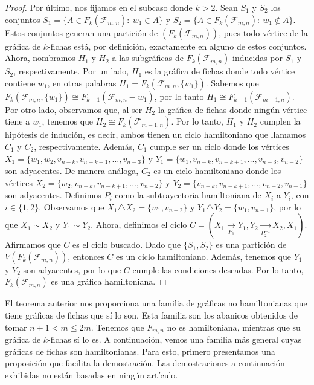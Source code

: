 \begin{proof}
    Por \'ultimo, nos fijamos en el subcaso donde $k>2$. Sean $S_1$ y $S_2$ los
    conjuntos $S_1=\{A \in F_k(\mathcal{F}_{m,n}) \colon\ w_1 \in A\}$ y
    $S_2=\{A \in F_k(\mathcal{F}_{m,n}) \colon\ w_1 \notin A\}$. Estos conjuntos
    generan una partici\'on de $(F_k(\mathcal{F}_{m,n}))$, pues todo v\'ertice
    de la gr\'afica de $k$-fichas est\'a, por definici\'on, exactamente en
    alguno de estos conjuntos. Ahora, nombramos $H_1$ y $H_2$ a las
    subgr\'aficas de $F_k(\mathcal{F}_{m,n})$ inducidas por $S_1$ y $S_2$,
    respectivamente. Por un lado, $H_1$ es la gr\'afica de fichas donde todo
    v\'ertice contiene $w_1$, en otras palabras $H_1=
    F_k(\mathcal{F}_{m,n},\{w_1\})$. Sabemos que $F_k(\mathcal{F}_{m,n},\{w_1\})
    \cong F_{k-1}(\mathcal{F}_{m,n}- w_1)$, por lo tanto $H_1 \cong
    F_{k-1}(\mathcal{F}_{m-1,n})$. Por otro lado, observamos que, al ser $H_2$
    la gr\'afica de fichas donde ning\'un v\'ertice tiene a $w_1$, tenemos que
    $H_2 \cong F_k(\mathcal{F}_{m-1,n})$. Por lo tanto, $H_1$ y $H_2$ cumplen la
    hip\'otesis de induci\'on, es decir, ambos tienen un ciclo hamiltoniano que
    llamamos $C_1$ y $C_2$, respectivamente. Adem\'as, $C_1$ cumple ser un ciclo
    donde los v\'ertices $X_1 = \{w_1, w_2,v_{n-k},v_{n-k+1}, \dots, v_{n-3}\}$
    y $Y_1 = \{w_1,v_{n-k},v_{n-k+1}, \dots, v_{n-3},v_{n-2}\}$ son adyacentes.
    De manera an\'aloga, $C_2$ es un ciclo hamiltoniano donde los v\'ertices
    $X_2 = \{ w_2,v_{n-k},v_{n-k+1}, \dots, v_{n-2}\}$ y $Y_2 =
    \{v_{n-k},v_{n-k+1}, \dots, v_{n-2},v_{n-1}\}$ son adyacentes. Definimos
    $P_i$ como la subtrayectoria hamiltoniana de $X_i$ a $Y_i$, con $i \in \{
    1,2 \}$. Observamos que $X_1 \triangle X_2 = \{w_1,v_{n-2}\}$ y $Y_1
    \triangle Y_2 = \{w_1, v_{n-1}\}$, por lo que $X_1 \sim X_2$ y $Y_1 \sim
    Y_2$. Ahora, definimos el ciclo $C = (X_1 \xrightarrow[P_1]{}Y_1,Y_2
    \xrightarrow[P_2^{-1}]{}X_2,X_1)$. Afirmamos que $C$ es el ciclo buscado.
    Dado que $\{S_1,S_2\}$ es una partici\'on de $V(F_k(\mathcal{F}_{m,n}))$,
    entonces $C$ es un ciclo hamiltoniano. Adem\'as, tenemos que $Y_1$ y $Y_2$
    son adyacentes, por lo que $C$ cumple las condiciones deseadas. Por lo
    tanto, $F_k(\mathcal{F}_{m,n})$ es una gr\'afica hamiltoniana.
\end{proof}

El teorema anterior nos proporciona una familia de gr\'aficas no hamiltonianas
que tiene gr\'aficas de fichas que s\'i lo son. Esta familia son los abanicos
obtenidos de tomar $n+1 < m \leq 2m$. Tenemos que $F_{m,n}$ no es hamiltoniana,
mientras que su gr\'afica de $k$-fichas s\'i lo es. A continuaci\'on, vemos una
familia m\'as general cuyas gr\'aficas de fichas son hamiltonianas. Para esto,
primero presentamos una proposici\'on que facilita la demostraci\'on. Las
demostraciones a continuaci\'on exhibidas no est\'an basadas en ning\'un
art\'iculo.

